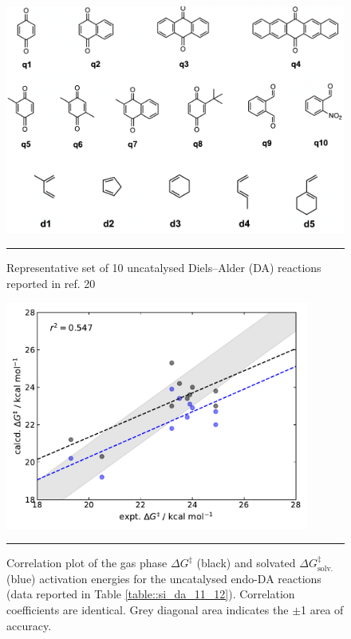 \documentclass[../../main.tex]{subfiles}
\begin{document}
\begin{figure}[h!]
	\vspace{0.4cm}
	\centering
	\includegraphics[width=13cm]{3/da//figs/figS20}
	\vspace{0.2cm}
	\hrule
	\caption{Representative set of 10 uncatalysed Diels–Alder (DA) reactions reported in ref. 20}
	\label{fig::si_da_20}
\end{figure}



\begin{figure}[h!]
	\vspace{0.4cm}
	\centering
	\includegraphics[width=10cm]{3/da//figs/figS21}
	\vspace{0.2cm}
	\hrule
	\caption{Correlation plot of the gas phase $\Delta G^\ddagger$ (black) and solvated $\Delta G^\ddagger_\text{solv.}$ (blue) activation energies for the uncatalysed endo-DA reactions (data reported in Table \ref{table::si_da_11_12}). Correlation coefficients are identical. Grey diagonal area indicates the $\pm$1 \kcalx area of accuracy.}
	\label{fig::si_da_21}
\end{figure}
\end{document}
